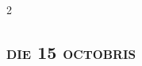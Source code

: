 \documentclass[9pt,twoside]{extarticle}
\begin{document}
\begin{multicols}{2}
%
%
%
%
%
%

%
\subsection*{\center \normalfont \textsc{die 15 octobris}}

\end{multicols}
\end{document}
